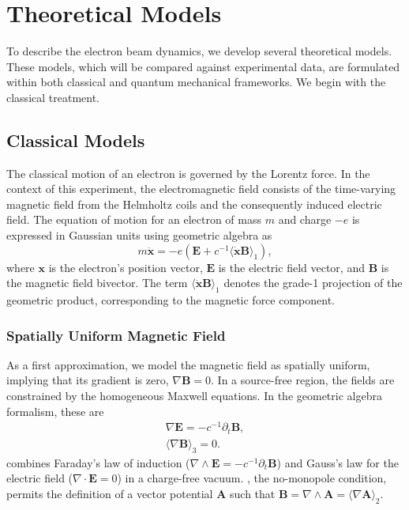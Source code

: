 \section{Theoretical Models}
\label{sec:TheoreticalModels}

To describe the electron beam dynamics, we develop several theoretical models.
These models, which will be compared against experimental data, are formulated
within both classical and quantum mechanical frameworks. We begin with the
classical treatment.

\subsection{Classical Models}
\label{sub:ClassicalModels}

The classical motion of an electron is governed by the Lorentz force. In the
context of this experiment, the electromagnetic field consists of the
time-varying magnetic field from the Helmholtz coils and the consequently
induced electric field. The equation of motion for an electron of mass $m$ and
charge $-e$ is expressed in Gaussian units using geometric algebra as
\begin{equation}
	m \ddot{\boldsymbol{x}} = -e \left( \boldsymbol{E}
	+ c^{-1} \langle \dot{\boldsymbol{x}} \boldsymbol{B} \rangle_{1} \right),
	\label{eq:lorentz-force}
\end{equation}
where $\boldsymbol{x}$ is the electron's position vector, $\boldsymbol{E}$ is
the electric field vector, and $\boldsymbol{B}$ is the magnetic field
bivector. The term $\langle \dot{\boldsymbol{x}} \boldsymbol{B} \rangle_{1}$
denotes the grade-1 projection of the geometric product, corresponding to the
magnetic force component.

\subsubsection{Spatially Uniform Magnetic Field}
\label{ssub:UniformMagneticField}

As a first approximation, we model the magnetic field as spatially uniform,
implying that its gradient is zero, $\nabla \boldsymbol{B} = 0$. In a
source-free region, the fields are constrained by the homogeneous Maxwell
equations. In the geometric algebra formalism, these are
\begin{gather}
	\label{eq:faraday-gauss}
	\nabla \boldsymbol{E} = -c^{-1} \partial_t \boldsymbol{B},
	\\
	\label{eq:no-monopoles}
	\langle \nabla \boldsymbol{B} \rangle_{3} = 0.
\end{gather}
 combines Faraday's law of induction
($\nabla \wedge \boldsymbol{E} = -c^{-1}\partial_t \boldsymbol{B}$) and Gauss's
law for the electric field ($\nabla \cdot \boldsymbol{E} = 0$) in a
charge-free vacuum. , the no-monopole condition,
permits the definition of a vector potential $\boldsymbol{A}$ such that
$\boldsymbol{B} = \nabla \wedge \boldsymbol{A} =
\langle \nabla \boldsymbol{A} \rangle_{2}$.

